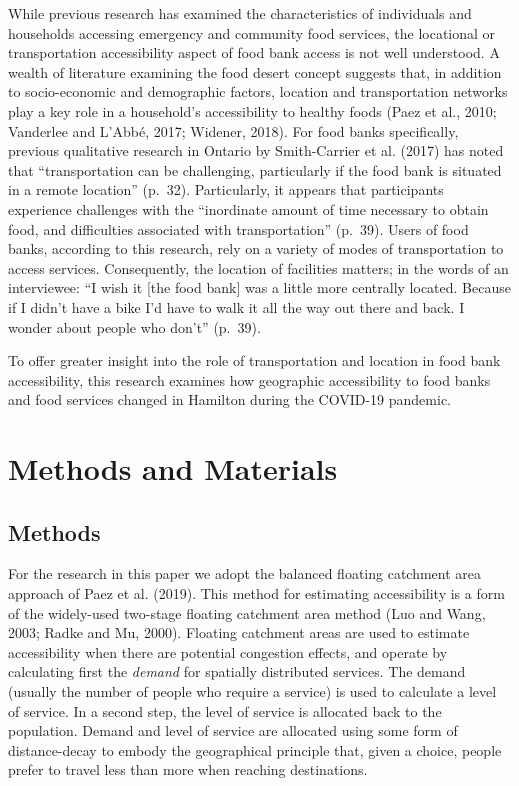 \documentclass[]{elsarticle} %
\begin{document}
While previous research has examined the characteristics of individuals
and households accessing emergency and community food services, the
locational or transportation accessibility aspect of food bank access is
not well understood. A wealth of literature examining the food desert
concept suggests that, in addition to socio-economic and demographic
factors, location and transportation networks play a key role in a
household's accessibility to healthy foods (Paez et al., 2010; Vanderlee
and L'Abbé, 2017; Widener, 2018). For food banks specifically, previous
qualitative research in Ontario by Smith-Carrier et al. (2017) has noted
that ``transportation can be challenging, particularly if the food bank
is situated in a remote location'' (p.~32). Particularly, it appears
that participants experience challenges with the ``inordinate amount of
time necessary to obtain food, and difficulties associated with
transportation'' (p.~39). Users of food banks, according to this
research, rely on a variety of modes of transportation to access
services. Consequently, the location of facilities matters; in the words
of an interviewee: ``I wish it {[}the food bank{]} was a little more
centrally located. Because if I didn't have a bike I'd have to walk it
all the way out there and back. I wonder about people who don't''
(p.~39).

To offer greater insight into the role of transportation and location in
food bank accessibility, this research examines how geographic
accessibility to food banks and food services changed in Hamilton during
the COVID-19 pandemic.

\hypertarget{methods-and-materials}{%
\section{Methods and Materials}\label{methods-and-materials}}

\hypertarget{methods}{%
\subsection{Methods}\label{methods}}

For the research in this paper we adopt the balanced floating catchment
area approach of Paez et al. (2019). This method for estimating
accessibility is a form of the widely-used two-stage floating catchment
area method (Luo and Wang, 2003; Radke and Mu, 2000). Floating catchment
areas are used to estimate accessibility when there are potential
congestion effects, and operate by calculating first the \emph{demand}
for spatially distributed services. The demand (usually the number of
people who require a service) is used to calculate a level of service.
In a second step, the level of service is allocated back to the
population. Demand and level of service are allocated using some form of
distance-decay to embody the geographical principle that, given a
choice, people prefer to travel less than more when reaching
destinations.
\end{document}

